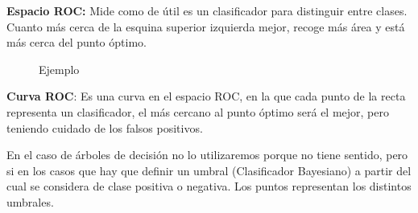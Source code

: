 \documentclass[12pt, twoside, openright]{report} %
\begin{document}
\textbf{Espacio ROC:} Mide como de útil es un clasificador para
distinguir entre clases. Cuanto más cerca de la esquina superior
izquierda mejor, recoge más área y está más cerca del punto óptimo.
\begin{figure}[H]
	Ejemplo
	{ %

}
\end{figure}
\textbf{Curva ROC}: Es una curva en el espacio ROC, en la que cada punto
de la recta representa un clasificador, el más cercano al punto óptimo
será el mejor, pero teniendo cuidado de los falsos positivos.

En el caso de árboles de decisión no lo utilizaremos porque no tiene
sentido, pero si en los casos que hay que definir un umbral
(Clasificador Bayesiano) a partir del cual se considera de clase positiva
o negativa. Los puntos representan los distintos umbrales.
\end{document}
